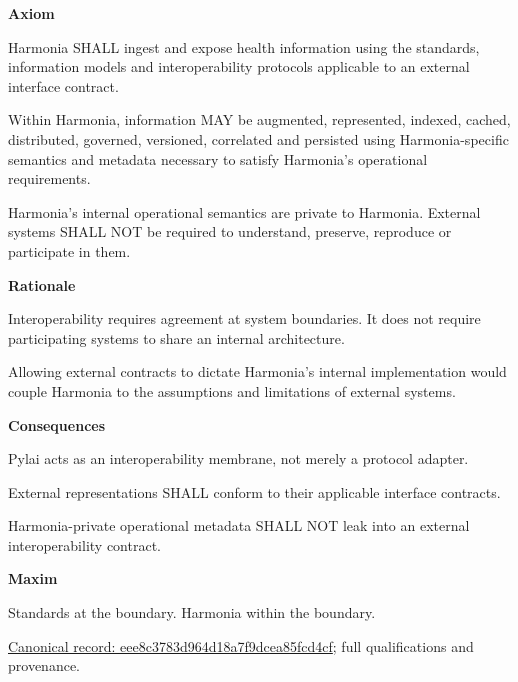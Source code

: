 \par\medskip\textbf{Axiom}\par


Harmonia SHALL ingest and expose health information using the standards,
information models and interoperability protocols applicable to an
external interface contract.



Within Harmonia, information MAY be augmented, represented, indexed,
cached, distributed, governed, versioned, correlated and persisted using
Harmonia-specific semantics and metadata necessary to satisfy Harmonia's
operational requirements.



Harmonia's internal operational semantics are private to Harmonia.
External systems SHALL NOT be required to understand, preserve,
reproduce or participate in them.



\par\medskip\textbf{Rationale}\par


Interoperability requires agreement at system boundaries. It does not
require participating systems to share an internal architecture.



Allowing external contracts to dictate Harmonia's internal
implementation would couple Harmonia to the assumptions and limitations
of external systems.



\par\medskip\textbf{Consequences}\par


Pylai acts as an interoperability membrane, not merely a protocol
adapter.



External representations SHALL conform to their applicable interface
contracts.



Harmonia-private operational metadata SHALL NOT leak into an external
interoperability contract.



\par\medskip\textbf{Maxim}\par


Standards at the boundary. Harmonia within the boundary.


{\footnotesize \href{../../../../../../../continuum/motivation/principle/eee8c3783d964d18a7f9dcea85fcd4cf.md}{Canonical record: eee8c3783d964d18a7f9dcea85fcd4cf}; full qualifications and provenance.}\par
